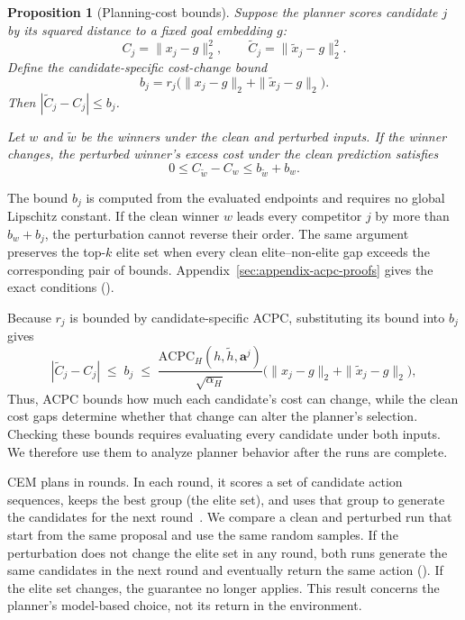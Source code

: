\documentclass[10pt]{article}
\newtheorem{proposition}{Proposition}
\begin{document}
\begin{proposition}[Planning-cost bounds]\label{prop:exact-cost-certificate}
Suppose the planner scores candidate $j$ by its squared distance to a fixed
goal embedding $g$:
\[
C_j=\|x_j-g\|_2^2,
\qquad
\tilde C_j=\|\tilde x_j-g\|_2^2.
\]
Define the candidate-specific cost-change bound
\begin{equation}
b_j=r_j\bigl(\|x_j-g\|_2+\|\tilde x_j-g\|_2\bigr).
\label{eq:exact-cost-bound}
\end{equation}
Then $|\tilde C_j-C_j|\leq b_j$.

Let $w$ and $\tilde w$ be the winners under the clean and perturbed inputs. If
the winner changes, the perturbed winner's excess cost under the clean
prediction satisfies
\begin{equation}
0\leq C_{\tilde w}-C_w\leq b_{\tilde w}+b_w.
\label{eq:fixed-pool-regret-bound}
\end{equation}
\end{proposition}

The bound $b_j$ is computed from the evaluated endpoints and requires no
global Lipschitz constant. If the clean winner $w$ leads every competitor $j$
by more than $b_w+b_j$, the perturbation cannot reverse their order. The same
argument preserves the top-$k$ elite set when every clean
elite--non-elite gap exceeds the corresponding pair of bounds.
Appendix~\ref{sec:appendix-acpc-proofs} gives the exact conditions
().

Because $r_j$ is bounded by candidate-specific ACPC, substituting its bound
into $b_j$ gives
\begin{equation}
|\tilde C_j-C_j|
\;\le\; b_j
\;\le\;
\frac{\mathrm{ACPC}_H(h,\tilde h,\mathbf a^j)}{\sqrt{\alpha_H}}
\bigl(\|x_j-g\|_2+\|\tilde x_j-g\|_2\bigr),
\label{eq:acpc-cost-chain}
\end{equation}
Thus, ACPC bounds how much each candidate's cost can change, while the clean
cost gaps determine whether that change can alter the planner's selection.
Checking these bounds requires evaluating every candidate under both inputs.
We therefore use them to analyze planner behavior after the runs are complete.

CEM plans in rounds. In each round, it scores a set of candidate action
sequences, keeps the best group (the elite set), and uses that group to
generate the candidates for the next round~\cite{kroese2006cem}. We compare a
clean and perturbed run that start from the same proposal and use the same
random samples. If the perturbation does not change the elite set in any
round, both runs generate the same candidates in the next round and
eventually return the same action
(). If the elite set changes, the guarantee
no longer applies. This result concerns the planner's model-based choice, not
its return in the environment.
\end{document}
